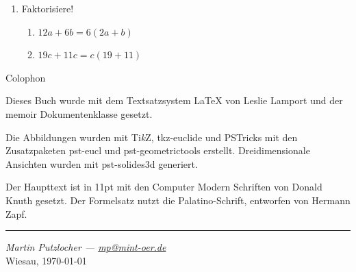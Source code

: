 \documentclass[
a6paper, %
11pt, %
onecolumn, %
openany, %
]{memoir}
\theoremstyle{break}
\theoremstyle{break}
\theoremstyle{changebreak}
\theoremstyle{nonumberbreak}
\theoremstyle{nonumberplain}
\begin{document}
\begin{enumerate}
 \item Faktorisiere!
 \begin{enumerate}
  \item \(12a+6b = 6(2a+b)\)
  \item \(19c+11c = c(19+11)\)
 \end{enumerate}

\end{enumerate}

\clearpage 
\listoffigures

\clearpage
\printindex

\clearpage
\def\tikzname{Ti\emph{k}Z} 
\pagestyle{empty}
\null\vfill

\begin{adjustwidth}{0.4in}{0.4in}
\begin{center}
{\Large\textsf{Colophon}}
\end{center}
\small
 \begin{center}
Dieses Buch wurde mit dem Textsatzsystem \LaTeX{} von Leslie Lamport und der
memoir Dokumentenklasse gesetzt.

Die Abbildungen wurden mit \tikzname{}, \textsf{tkz-euclide} und PSTricks mit den Zusatzpaketen \textsf{pst-eucl} und \textsf{pst-geometrictools} erstellt. Dreidimensionale Ansichten wurden mit \textsf{pst-solides3d} generiert.

Der Haupttext ist in 11pt mit den Computer Modern Schriften von Donald Knuth gesetzt.
Der Formelsatz nutzt die Palatino-Schrift, entworfen von Hermann Zapf.
\end{center} 

\end{adjustwidth}
\vfill
\hrule
\vfil
\begin{center}
\textit{Martin Putzlocher --- \url{mp@mint-oer.de}}\\
Wiesau, \today
\end{center}


% 
% 
\end{document}
